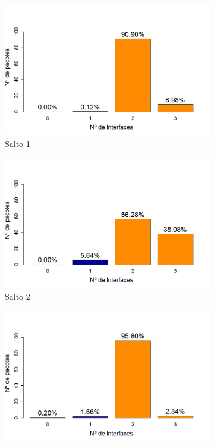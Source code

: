\documentclass[
	12pt,				%
	openright,			%
	oneside,
	a4paper,			%
	english,			%
	french,				%
	spanish,			%
	brazil				%
	]{abntex2}
\begin{document}
\begin{figure}[htb]
	\centering
	\caption{Ditribuição da recepção dos pacotes (Sem otimização)}
	\label{fig_dpr_no_opt}
	\begin{subfigure}{.5\textwidth}
		\centering
		\includegraphics[width=.98\linewidth]{DRP_Salto1}
		\captionsetup{width=.9\textwidth}
		\caption{Salto 1}
		\label{dpr_no_opt_s1}
	\end{subfigure}%
	\begin{subfigure}{.5\textwidth}
		\centering
		\includegraphics[width=.98\linewidth]{DRP_Salto2}
		\captionsetup{width=.9\textwidth}
		\caption{Salto 2}
		\label{dpr_no_opt_s2}
	\end{subfigure}
	\begin{subfigure}{.5\textwidth}
		\centering
		\includegraphics[width=.98\linewidth]{DRP_Salto3}

\end{subfigure}
\end{figure}
\end{document}
